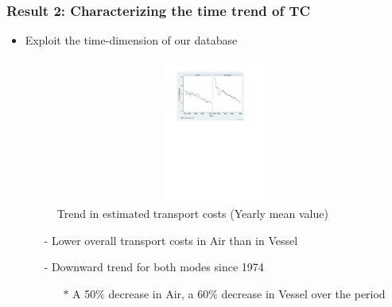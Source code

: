 \documentclass[10 pt,Helvetica, french]{beamer}
\begin{document}
\begin{frame}[label = slide_fig1]
\frametitle{Result 2: Characterizing the time trend of TC }
\begin{itemize}
\item Exploit the time-dimension of our database  \hyperlink{slide_result1}{} %
\begin{figure}[htbp]
\caption{Trend in estimated transport costs (Yearly mean value)}
\label{fig:Trends_in_TC}
\begin{center}
\includegraphics[width=10.5cm, height=4.75cm]{Figure1_Trend_of_totalTC_bymode.pdf}
\end{center}
\end{figure}

\begin{itemize}
\item[-] Lower overall transport costs in Air than in Vessel \vspace{0.1cm}
\item[-] Downward trend for both modes since 1974 \vspace{0.1cm}
\begin{itemize}
\item[$\ast$] A 50\% decrease in Air, a 60\% decrease in Vessel over the period
\end{itemize}
\end{itemize}
\end{itemize}
\end{frame}
\end{document}
